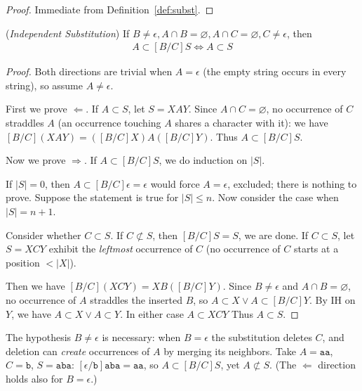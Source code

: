 \documentclass[runningheads,envcountsect]{llncs}
\renewenvironment{remark}
  {\rmfamily\trivlist\item[\hskip\labelsep{\itshape Remark.}]\ignorespaces}
  {\endtrivlist}
\begin{document}
\begin{proof}
    Immediate from Definition~\ref{def:subst}.
\end{proof}

\begin{lemma}
    (\emph{Independent Substitution})
    If $B \neq \epsilon, A \cap B = \varnothing, A \cap C = \varnothing, C \neq \epsilon$, then
    \begin{align}
        A\subset [B/C]S \Leftrightarrow A \subset S
    \end{align}
    \label{thm:independent substitution}
\end{lemma}

\begin{proof}
    Both directions are trivial when $A = \epsilon$ (the empty string occurs in every string), so assume $A \neq \epsilon$.

    First we prove $\Leftarrow$.
    If $A \subset S$, let $S = XAY$. Since $A \cap C = \varnothing$, no occurrence of $C$ straddles $A$ (an occurrence touching $A$ shares a character with it): we have $[B/C](XAY) = ([B/C]X)A([B/C]Y)$. Thus $A \subset [B/C]S$.

    Now we prove $\Rightarrow$.
    If $A \subset [B/C]S$, we do induction on $|S|$.

    If $|S| = 0$, then $A \subset [B/C]\epsilon = \epsilon$ would force $A = \epsilon$, excluded; there is nothing to prove. Suppose the statement is true for $|S|\leq n$. Now consider the case when $|S| = n+1$.

    Consider whether $C \subset S$. If $C \not\subset S$, then $[B/C]S = S$, we are done. If $C \subset S$, let $S = XCY$ exhibit the \emph{leftmost} occurrence of $C$ (no occurrence of $C$ starts at a position $< |X|$).

    Then we have $[B/C](XCY) = XB([B/C]Y)$. Since $B \neq \epsilon$ and $A \cap B = \varnothing$, no occurrence of $A$ straddles the inserted $B$, so $A \subset X \lor A \subset [B/C]Y$. By IH on $Y$, we have $A \subset X \lor A \subset Y$. In either case $A\subset XCY$ Thus $A \subset S$.
\end{proof}

\begin{remark}
    The hypothesis $B \neq \epsilon$ is necessary: when $B = \epsilon$ the substitution deletes $C$, and deletion can \emph{create} occurrences of $A$ by merging its neighbors. Take $A = \mathtt{aa}$, $C = \mathtt{b}$, $S = \mathtt{aba}$: $[\epsilon/\mathtt{b}]\mathtt{aba} = \mathtt{aa}$, so $A \subset [B/C]S$, yet $A \not\subset S$. (The $\Leftarrow$ direction holds also for $B = \epsilon$.)
\end{remark}
\end{document}
